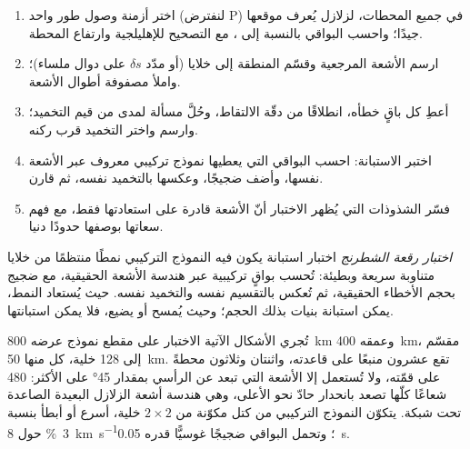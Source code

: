\begin{method}\label{met:b3:seismology-imaging:tomo}
\begin{enumerate}
  \item اختر أزمنة وصول طور واحد (لنفترض P) في جميع المحطات، لزلازل
        يُعرف موقعها جيدًا؛ واحسب البواقي
        بالنسبة إلى ، مع التصحيح للإهليلجية
        وارتفاع المحطة.
  \item ارسم الأشعة المرجعية وقسّم المنطقة إلى خلايا (أو مدّد
        $\delta s$ على دوال ملساء)؛ واملأ مصفوفة أطوال الأشعة.
  \item أعطِ كل باقٍ خطأه، انطلاقًا من دقّة الالتقاط، وحُلَّ
        مسألة  لمدى من قيم التخميد؛ وارسم
         واختر التخميد قرب ركنه.
  \item اختبر الاستبانة: احسب البواقي التي يعطيها نموذج تركيبي معروف
        عبر الأشعة نفسها، وأضف ضجيجًا، وعكسها بالتخميد
        نفسه، ثم قارن.
  \item فسّر الشذوذات التي يُظهر الاختبار أنّ الأشعة قادرة على
        استعادتها فقط، مع فهم سعاتها بوصفها حدودًا دنيا.
\end{enumerate}
\end{method}

\begin{definition}\label{def:b3:seismology-imaging:checkerboard}
\emph{اختبار رقعة الشطرنج} اختبار استبانة يكون فيه
النموذج التركيبي نمطًا منتظمًا من خلايا متناوبة سريعة وبطيئة:
تُحسب بواقٍ تركيبية عبر هندسة الأشعة الحقيقية، مع ضجيج
بحجم الأخطاء الحقيقية، ثم تُعكس بالتقسيم نفسه
والتخميد نفسه. حيث يُستعاد النمط، يمكن استبانة بنيات بذلك الحجم؛
وحيث يُمسح أو يضيع، فلا يمكن استبانتها.
\end{definition}

تُجري الأشكال الآتية الاختبار على مقطع نموذج عرضه \qty{800}{km}
وعمقه \qty{400}{km}، مقسّم إلى 128 خلية، كل منها \qty{50}{km}. تقع عشرون منبعًا
على قاعدته، واثنتان وثلاثون محطةً على قمّته، ولا تُستعمل إلا الأشعة التي تبعد
عن الرأسي بمقدار \ang{45} على الأكثر: 480 شعاعًا كلّها تصعد بانحدار حادّ نحو الأعلى،
وهي هندسة أشعة الزلازل البعيدة الصاعدة تحت شبكة.
يتكوّن النموذج التركيبي من كتل مكوّنة من $2\times2$ خلية، أسرع أو أبطأ بنسبة
\qty{3}{\percent} حول \qty{8}{km.s^{-1}}؛ وتحمل البواقي ضجيجًا غوسيًّا قدره
\qty{0.05}{s}.

